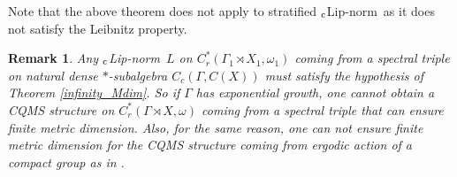 \documentclass[a4paper,11pt,reqno]{amsart}
\theoremstyle{plain}
\newtheorem{rem}[thm]{Remark}
\theoremstyle{mainthmstyle}
\theoremstyle{named}
\numberwithin{equation}{section}
\newcommand{\clipnorm}{$_{\text{\rm c}}$Lip-norm}
\begin{document}
Note that the above theorem does not apply to stratified \clipnorm \ as it does not satisfy the Leibnitz property.
\begin{rem}
    Any \clipnorm\ $L$ on $C^{\ast}_{r}(\Gamma_{1} \rtimes X_{1},\omega_1)$ coming from a spectral triple on natural dense $\ast$-subalgebra $C_{c}(\Gamma, C(X))$ must satisfy the hypothesis of Theorem \ref{infinity_Mdim}. So if $\Gamma$ has exponential growth, one cannot obtain a CQMS structure on $C^{\ast}_{r}(\Gamma\rtimes X,\omega)$ coming from a spectral triple that can ensure finite metric dimension. Also, for the same reason, one can not ensure finite metric dimension for the CQMS structure coming from ergodic action of a compact group as in \cite{Rieffel-1998-Metrics-on-state-from-action-of-cmpt-gp}.
\end{rem}
\end{document}
